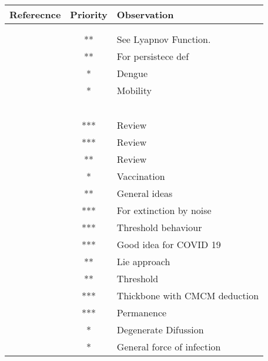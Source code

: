 %
\pagebreak
\begin{table}
	\begin{tabular}{rcl} 
		\toprule
			Referecnce
			&
			Priority
			&
			Observation
		\\
		\midrule
		\\
		\cite{Zhao2013}
		\\
		\cite{Zhang2017a}	&	**  & See Lyapnov Function.
		\\
		\cite{Liu2018a} &       **  & For persistece def
		\\
		\cite{Liu2018d} &        *   & Dengue
		\\
		\cite{Cai2017a} &        *   & Mobility	
		\\
		\cite{Lu2009} & 
		\\
		\cite{ElFatini2018}
		\\
		\cite{Liu2019b}
		\\
		\cite{Lahrouz2017a}
		\\
		\cite{Wang2018a}
		\\
		\cite{Cao2016a} 	& *** & Review
		\\
		\cite{Tang2015} 	& *** & Review
		\\
		\cite{Ji2014} 		& ** &Review
		\\
		\cite{Liu2018b} 	& * & Vaccination
		\\
		\cite{Cai2015} 		& ** & General ideas
		\\
		\cite{Zhang2018a} 	& *** & For extinction by noise
		\\
		\cite{Zhao2014} 	& *** & Threshold behaviour
		\\
		\cite{Chang2017}    & *** & Good idea for COVID 19
		\\		
		\cite{Dieu2018}     & ** & Lie approach		
		\\
		\cite{Lin2014a}     & **  & Threshold
		\\
		\cite{Maliyoni2017} & ***  	&	 Thickbone with CMCM deduction
		\\
		\cite{Qiu2013}		& ***   &	 Permanence
		\\
		\cite{Lin2017a}		&	*   &	Degenerate Difussion
		\\
		\cite{Cai2013}		&	*   &	General force of infection 
		\\
		\bottomrule
	\end{tabular}
\end{table}
{}
